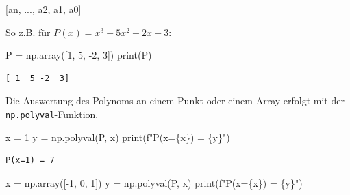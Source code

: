 \documentclass[
  letterpaper,
  DIV=11,
  numbers=noendperiod]{scrreprt}
\newenvironment{Shaded}{\begin{snugshade}}{\end{snugshade}}
\newcommand{\BuiltInTok}[1]{\textcolor[rgb]{0.00,0.23,0.31}{#1}}
\newcommand{\DecValTok}[1]{\textcolor[rgb]{0.68,0.00,0.00}{#1}}
\newcommand{\NormalTok}[1]{\textcolor[rgb]{0.00,0.23,0.31}{#1}}
\newcommand{\OperatorTok}[1]{\textcolor[rgb]{0.37,0.37,0.37}{#1}}
\newcommand{\SpecialCharTok}[1]{\textcolor[rgb]{0.37,0.37,0.37}{#1}}
\newcommand{\SpecialStringTok}[1]{\textcolor[rgb]{0.13,0.47,0.30}{#1}}
\begin{document}
\begin{Shaded}
\begin{Highlighting}[]
\NormalTok{[an, ..., a2, a1, a0]}
\end{Highlighting}
\end{Shaded}

So z.B. für \(P(x) = x^3 + 5x^2 - 2x + 3\):

\begin{Shaded}
\begin{Highlighting}[]
\NormalTok{P }\OperatorTok{=}\NormalTok{ np.array([}\DecValTok{1}\NormalTok{, }\DecValTok{5}\NormalTok{, }\OperatorTok{{-}}\DecValTok{2}\NormalTok{, }\DecValTok{3}\NormalTok{])}
\BuiltInTok{print}\NormalTok{(P)}
\end{Highlighting}
\end{Shaded}

\begin{verbatim}
[ 1  5 -2  3]
\end{verbatim}

Die Auswertung des Polynoms an einem Punkt oder einem Array erfolgt mit
der \texttt{np.polyval}-Funktion.

\begin{Shaded}
\begin{Highlighting}[]
\NormalTok{x }\OperatorTok{=} \DecValTok{1}
\NormalTok{y }\OperatorTok{=}\NormalTok{ np.polyval(P, x)}
\BuiltInTok{print}\NormalTok{(}\SpecialStringTok{f"P(x=}\SpecialCharTok{\{}\NormalTok{x}\SpecialCharTok{\}}\SpecialStringTok{) = }\SpecialCharTok{\{}\NormalTok{y}\SpecialCharTok{\}}\SpecialStringTok{"}\NormalTok{)}
\end{Highlighting}
\end{Shaded}

\begin{verbatim}
P(x=1) = 7
\end{verbatim}

\begin{Shaded}
\begin{Highlighting}[]
\NormalTok{x }\OperatorTok{=}\NormalTok{ np.array([}\OperatorTok{{-}}\DecValTok{1}\NormalTok{, }\DecValTok{0}\NormalTok{, }\DecValTok{1}\NormalTok{])}
\NormalTok{y }\OperatorTok{=}\NormalTok{ np.polyval(P, x)}
\BuiltInTok{print}\NormalTok{(}\SpecialStringTok{f"P(x=}\SpecialCharTok{\{}\NormalTok{x}\SpecialCharTok{\}}\SpecialStringTok{) = }\SpecialCharTok{\{}\NormalTok{y}\SpecialCharTok{\}}\SpecialStringTok{"}\NormalTok{)}
\end{Highlighting}
\end{Shaded}
\end{document}
